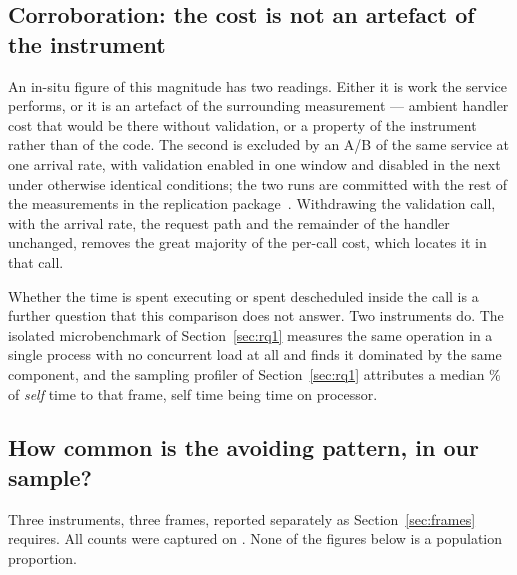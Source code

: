 \documentclass[pdflatex,sn-basic,twocolumn]{sn-jnl}%
\begin{document}
\else

\subsection{Corroboration: the cost is not an artefact of the
instrument}\label{sec:abcorroboration}

An in-situ figure of this magnitude has two readings. Either it is work the
service performs, or it is an artefact of the surrounding measurement --- ambient
handler cost that would be there without validation, or a property of the
instrument rather than of the code. The second is excluded by an A/B of the same
service at one arrival rate, with validation enabled in one window and disabled
in the next under otherwise identical conditions; the two runs are committed with
the rest of the measurements in the replication package~\cite{artifact2026}.
Withdrawing the validation call, with the arrival rate, the request path and the
remainder of the handler unchanged, removes the great majority of the per-call
cost, which locates it in that call.

Whether the time is spent executing or spent descheduled inside the call is a
further question that this comparison does not answer. Two instruments do. The
isolated microbenchmark of Section~\ref{sec:rq1} measures the same operation in a
single process with no concurrent load at all and finds it dominated by the same
component, and the sampling profiler of Section~\ref{sec:rq1} attributes a median
\ProfHostPct\% of \emph{self} time to that frame, self time being time on
processor.

\fi

\subsection{How common is the avoiding pattern, in our
sample?}\label{sec:prevalence}

Three instruments, three frames, reported separately as Section~\ref{sec:frames}
requires. All counts were captured on \PopCapturedAt. None of the figures below
is a population proportion.
\end{document}
